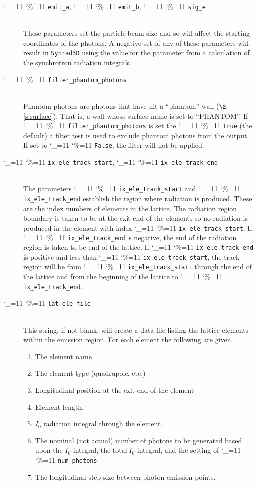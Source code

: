 \documentclass[11pt,openany]{report}
\newcommand{\sref}[1]{$\S$\ref{#1}}
\newcommand{\srthree}{\texttt{Synrad3D}\xspace}
\newcommand\ttcmd{\begingroup\catcode`\_=11 \catcode`\%=11 \dottcmd}
\newcommand\dottcmd[1]{\texttt{#1}\endgroup}
\newcommand{\vn}{\ttcmd}
\newcommand{\Newline}{\hfil \\}
\begin{document}
\begin{description}
  \item[\vn{emit_a}, \vn{emit_b}, \vn{sig_e}] \Newline
These parameters set the particle beam size and so will affect the starting coordinates of
the photons. A negative set of any of these parameters will result in \srthree 
using the value for the parameter from a calculation of the synchrotron radiation integrals.

  \item[\vn{filter_phantom_photons}] \Newline
Phantom photons are photons that have hit a ``phantom'' wall (\sref{s:surface}).  That is,
a wall whose surface name is set to ``PHANTOM''. If \vn{filter_phantom_photons} is set the
\vn{True} (the default) a filter test is used to exclude phantom photons from the output.
If set to \vn{False}, the filter will not be applied.

  \item[\vn{ix_ele_track_start}, \vn{ix_ele_track_end}] \Newline
The parameters \vn{ix_ele_track_start} and \vn{ix_ele_track_end} establish
the region where radiation is produced. These are the index numbers of 
elements in the lattice. The radiation region boundary is taken to be at
the exit end of the elements so no radiation is produced in the element
with index \vn{ix_ele_track_start}. If \vn{ix_ele_track_end} is negative,
the end of the radiation region is taken to be end of the lattice.
If \vn{ix_ele_track_end} is positive and less than \vn{ix_ele_track_start},
the track region will be from \vn{ix_ele_track_start} through the
end of the lattice and from the beginning of the lattice to \vn{ix_ele_track_end}.

  \item[\vn{lat_ele_file}] \Newline
This string, if not blank, will create a data file listing  the lattice
elements within the emission region. For each element the following are given. 
  \begin{enumerate}
  \item
    The element name
  \item
    The element type (quadrupole, etc.)
  \item
    Longitudinal position at the exit end of the element
  \item
    Element length.
  \item
    $I_0$ radiation integral through the element.
  \item
    The nominal (not actual) number of photons to be generated based upon the $I_0$ integral,
    the total $I_0$ integral, and the setting of \vn{num_photons}
  \item
    The longitudinal step size between photon emission points.
  \end{enumerate}


\end{description}
\end{document}
